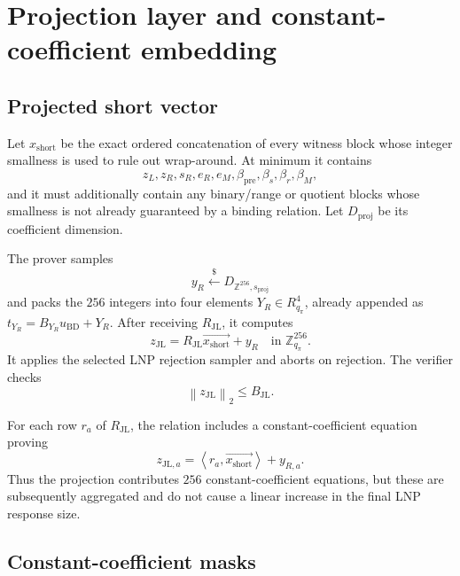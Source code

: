 \documentclass[11pt,a4paper]{article}
\newcommand{\Z}{\mathbb{Z}}
\newcommand{\Rpi}{R_{q_{\pi}}}
\newcommand{\proofmod}{q_{\pi}}
\newcommand{\vecx}[1]{\overrightarrow{#1}}
\newcommand{\norm}[1]{\left\lVert #1\right\rVert}
\newcommand{\inner}[2]{\left\langle #1,#2\right\rangle}
\newcommand{\getsr}{\xleftarrow{\$}}
\begin{document}
\section{Projection layer and constant-coefficient embedding}

\subsection{Projected short vector}

Let \(x_{\mathrm{short}}\) be the exact ordered concatenation of every witness
block whose integer smallness is used to rule out wrap-around.  At minimum it
contains
\[
  z_L,z_R,s_R,e_R,e_M,
  \beta_{\mathrm{pre}},\beta_s,\beta_r,\beta_M,
\]
and it must additionally contain any binary/range or quotient blocks whose
smallness is not already guaranteed by a binding relation.  Let
\(D_{\mathrm{proj}}\) be its coefficient dimension.

The prover samples
\[
  y_R\getsr D_{\Z^{256},s_{\mathrm{proj}}}
\]
and packs the \(256\) integers into four elements
\(Y_R\in\Rpi^4\), already appended as
\(t_{Y_R}=B_{Y_R}u_{\mathrm{BD}}+Y_R\).
After receiving \(R_{\mathrm{JL}}\), it computes
\begin{equation}
  z_{\mathrm{JL}}
  =R_{\mathrm{JL}}\vecx{x_{\mathrm{short}}}+y_R
  \quad\text{in }\Z_{\proofmod}^{256}.
  \label{eq:projection-response}
\end{equation}
It applies the selected LNP rejection sampler and aborts on rejection.  The
verifier checks
\begin{equation}
  \norm{z_{\mathrm{JL}}}_2\le B_{\mathrm{JL}}.
  \label{eq:projection-norm-check}
\end{equation}

For each row \(r_a\) of \(R_{\mathrm{JL}}\), the relation includes a
constant-coefficient equation proving
\[
  z_{\mathrm{JL},a}
  =\inner{r_a}{\vecx{x_{\mathrm{short}}}}+y_{R,a}.
\]
Thus the projection contributes \(256\) constant-coefficient equations, but
these are subsequently aggregated and do not cause a linear increase in the
final LNP response size.

\subsection{Constant-coefficient masks}
\end{document}

